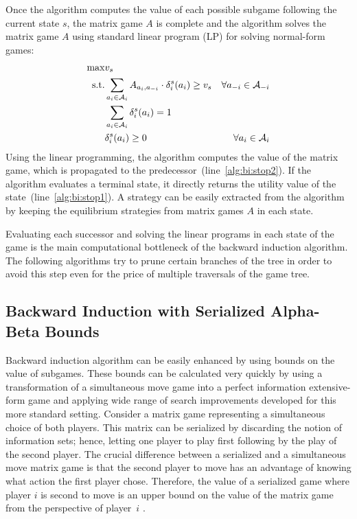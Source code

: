 Once the algorithm computes the value of each possible subgame following the current state $s$, the matrix game $A$ is complete and the algorithm solves the matrix game $A$ using standard linear program (LP) for solving normal-form games:
\begin{eqnarray}
\max & v_s & \\
\textrm{s.t.} & \sum_{a_i \in \mathcal{A}_{i}}A_{a_i,a_{-i}} \cdot \delta^{s}_i(a_i) \geq v_s & \forall a_{-i} \in \mathcal{A}_{-i}\\
& \sum_{a_{i} \in \mathcal{A}_{i}} \delta^{s}_{i}(a_{i}) = 1 \\
& \delta^{s}_{i}(a_{i}) \geq 0 & \forall a_{i} \in \mathcal{A}_{i} 
\end{eqnarray}
Using the linear programming, the algorithm computes the value of the matrix game, which is propagated to the predecessor~(line~\ref{alg:bi:stop2}). 
If the algorithm evaluates a terminal state, it directly returns the utility value of the state~(line~\ref{alg:bi:stop1}).
A strategy can be easily extracted from the algorithm by keeping the equilibrium strategies from matrix games $A$ in each state.

Evaluating each successor and solving the linear programs in each state of the game is the main computational bottleneck of the backward induction algorithm. 
The following algorithms try to prune certain branches of the tree in order to avoid this step even for the price of multiple traversals of the game tree.

\subsection{Backward Induction with Serialized Alpha-Beta Bounds}\label{sec:algs:biab}

Backward induction algorithm can be easily enhanced by using bounds on the value of subgames. 
These bounds can be calculated very quickly by using a transformation of a simultaneous move game into a perfect information extensive-form game and applying wide range of search improvements developed for this more standard setting.
Consider a matrix game representing a simultaneous choice of both players.
This matrix can be serialized by discarding the notion of information sets; hence, letting one player to play first following by the play of the second player. 
The crucial difference between a serialized and a simultaneous move matrix game is that the second player to move has an advantage of knowing what action the first player chose. 
Therefore, the value of a serialized game where player $i$ is second to move is an upper bound on the value of the matrix game from the perspective of player~$i$ \cite{Bosansky13Using}.

